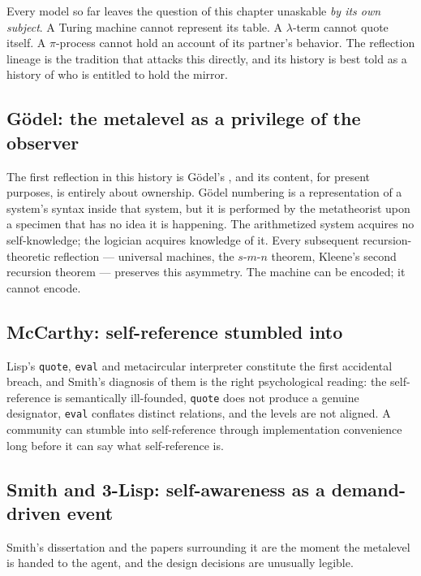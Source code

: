 Every model so far leaves the question of this chapter unaskable
\emph{by its own subject}.
A Turing machine cannot represent its table.
A $\lambda$-term cannot quote itself.
A $\pi$-process cannot hold an account of its partner's behavior.
The reflection lineage is the tradition that attacks this directly,
and its history is best told as a history of who is entitled to hold
the mirror.

\subsection{G\"odel: the metalevel as a privilege of the observer}

The first reflection in this history is G\"odel's \cite{godel1931},
and its content, for present purposes, is entirely about ownership.
G\"odel numbering is a representation of a system's syntax inside
that system, but it is performed by the metatheorist upon a specimen
that has no idea it is happening.
The arithmetized system acquires no self-knowledge; the logician
acquires knowledge of it.
Every subsequent recursion-theoretic reflection --- universal
machines, the $s$-$m$-$n$ theorem, Kleene's second recursion theorem
--- preserves this asymmetry.
The machine can be encoded; it cannot encode.

\subsection{McCarthy: self-reference stumbled into}

Lisp's \texttt{quote}, \texttt{eval} and metacircular interpreter
\cite{mccarthy1960} constitute the first accidental breach, and
Smith's diagnosis of them is the right psychological reading: the
self-reference is semantically ill-founded, \texttt{quote} does not
produce a genuine designator, \texttt{eval} conflates distinct
relations, and the levels are not aligned.
A community can stumble into self-reference through implementation
convenience long before it can say what self-reference is.

\subsection{Smith and 3-Lisp: self-awareness as a demand-driven
event}
\label{psy:sec:smith}

Smith's dissertation and the papers surrounding it
\cite{smith1982,smith1984,desrivieres1984} are the moment the
metalevel is handed to the agent, and the design decisions are
unusually legible.

